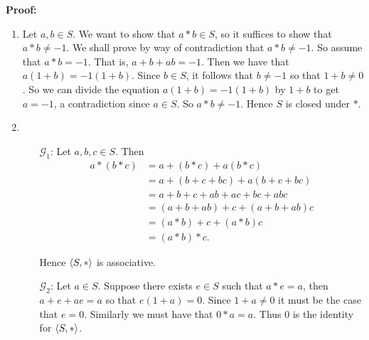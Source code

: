 \begin{enumerate}
		\textbf{Proof:}
      \begin{enumerate}
         \item Let $a, b \in S$. We want to show that $a * b \in S$, so it
               suffices to show that $a * b \neq -1$. We shall prove by way of 
               contradiction that $a * b \neq -1$. So assume that $a * b = -1$.
               That is, $a + b + ab = -1$. Then we have that
               $a(1 + b) = -1(1 + b)$. Since $b \in S$, it follows that
               $b \neq -1$ so that $1 + b \neq 0$. So we can divide the equation
               $a(1 + b) = -1(1 + b)$ by $1 + b$ to get $a = -1$, a 
               contradiction since $a \in S$. So $a * b \neq -1$. Hence $S$ is
               closed under $*$.
         \item \begin{enumerate}
			         \item[$\mathscr{G}_1$:] Let $a, b, c \in S$. Then
                                          \begin{align*}
                                             a * (b * c) &= a + (b * c) +
                                                            a(b * c) \\
                                                         &= a + (b + c + bc) +
                                                            a(b + c + bc) \\
                                                         &= a + b + c + ab +
                                                            ac + bc + abc \\
                                                         &= (a + b + ab) + c +
                                                            (a + b + ab)c \\
                                                         &= (a * b) + c +
                                                            (a * b)c \\
                                                         &= (a * b) * c.
                                          \end{align*}

                                          Hence $\langle S, * \rangle$ is associative.
											
			         \item[$\mathscr{G}_2$:] Let $a \in S$. Suppose there exists 
                                          $e \in S$ such that $a * e = a$, then
                                          $a + e + ae = a$ so that
                                          $e(1 + a) = 0$. Since $1 + a \neq 0$
                                          it must be the case that $e = 0$.
                                          Similarly we must have that
                                          $0 * a = a$. Thus 0 is the identity
                                          for $\langle S, * \rangle$.
                           

\end{enumerate}
\end{enumerate}
\end{enumerate}
